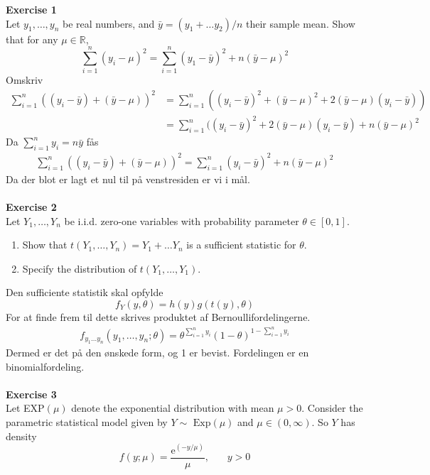 \documentclass[12pt,a4paper]{report}
\author{Frederik Appel Vardinghus-Nielsen}
\begin{document}
\noindent\textbf{Exercise 1}\\
Let $y_1,\ldots,y_n$ be real numbers, and $\bar{y}=(y_1+\ldots y_2)/n$ their sample mean. Show that for any $\mu\in\mathbb{R}$,
\begin{equation}
\sum_{i=1}^n(y_i-\mu)^2=\sum_{i=1}^n (y_1-\bar{y})^2+n(\bar{y}-\mu)^2
\end{equation}
Omskriv
\begin{align*}
\sum_{i=1}^n((y_i-\bar{y})+(\bar{y}-\mu))^2&=\sum_{i=1}^n((y_i-\bar{y})^2+(\bar{y}-\mu)^2+2(\bar{y}-\mu)(y_i-\bar{y}))\\
&=\sum_{i=1}^n((y_i-\bar{y})^2+2(\bar{y}-\mu)(y_i-\bar{y})+n(\bar{y}-\mu)^2
\end{align*}
Da $\sum_{i=1}^ny_i=n\bar{y}$ fås
\begin{align*}
\sum_{i=1}^n((y_i-\bar{y})+(\bar{y}-\mu))^2=\sum_{i=1}^n(y_i-\bar{y})^2+n(\bar{y}-\mu)^2
\end{align*}
Da der blot er lagt et nul til på venstresiden er vi i mål.\\\\
\textbf{Exercise 2}\\
Let $Y_1,\ldots,Y_n$ be i.i.d. zero-one variables with probability parameter $\theta\in[0,1]$.
\begin{enumerate}
\item Show that $t(Y_1,\ldots,Y_n)=Y_1+\ldots Y_n$ is a sufficient statistic for $\theta$.
\item Specify the distribution of $t(Y_1,\ldots,Y_1)$.
\end{enumerate}
Den sufficiente statistik skal opfylde
\begin{equation}
f_Y(y,\theta)=h(y)g(t(y),\theta)
\end{equation}
For at finde frem til dette skrives produktet af Bernoullifordelingerne.
\begin{align*}
f_{y_1\ldots y_n}(y_1,\ldots,y_n;\theta)=\theta^{\sum_{i=1}^ny_i}(1-\theta)^{1-\sum_{i=1}^ny_i}
\end{align*}
Dermed er det på den ønskede form, og 1 er bevist. Fordelingen er en binomialfordeling.\\\\
\textbf{Exercise 3}\\
Let EXP$(\mu)$ denote the exponential distribution with mean $\mu>0$. Consider the parametric statistical model given by $Y\sim\text{ Exp}(\mu)$ and $\mu\in(0,\infty)$. So $Y$ has density
\begin{equation}
f(y;\mu)=\frac{\mathrm{e}^{(-y/\mu)}}{\mu},\phantom{mm}y>0
\end{equation}
\end{document}
